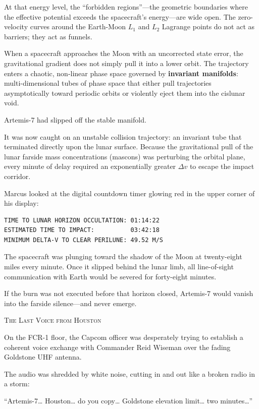 \documentclass[12pt,twoside,openright]{book}
\newcommand{\sceneheader}[1]{%
  \par\vspace{1.8em}%
  {\noindent\centering\scshape\large #1\par}%
  \vspace{1.0em}%
  \noindent%
}
\newcommand{\dinkus}{%
  \par\vspace{1.2em}%
  {\noindent\centering{\large $\ast\quad\ast\quad\ast$}\par}%
  \vspace{1.2em}%
  \noindent%
}
\begin{document}
At that energy level, the ``forbidden regions''---the geometric
boundaries where the effective potential exceeds the spacecraft's
energy---are wide open. The zero-velocity curves around the Earth-Moon
\(L_1\) and \(L_2\) Lagrange points do not act as barriers; they act as
funnels.

When a spacecraft approaches the Moon with an uncorrected state error,
the gravitational gradient does not simply pull it into a lower orbit.
The trajectory enters a chaotic, non-linear phase space governed by
\textbf{invariant manifolds}: multi-dimensional tubes of phase space
that either pull trajectories asymptotically toward periodic orbits or
violently eject them into the cislunar void.

Artemis-7 had slipped off the stable manifold.

It was now caught on an unstable collision trajectory: an invariant tube
that terminated directly upon the lunar surface. Because the
gravitational pull of the lunar farside mass concentrations (mascons)
was perturbing the orbital plane, every minute of delay required an
exponentially greater \(\Delta v\) to escape the impact corridor.

Marcus looked at the digital countdown timer glowing red in the upper
corner of his display:

\begin{lstlisting}
TIME TO LUNAR HORIZON OCCULTATION: 01:14:22
ESTIMATED TIME TO IMPACT:          03:42:18
MINIMUM DELTA-V TO CLEAR PERILUNE: 49.52 M/S
\end{lstlisting}

The spacecraft was plunging toward the shadow of the Moon at
twenty-eight miles every minute. Once it slipped behind the lunar limb,
all line-of-sight communication with Earth would be severed for
forty-eight minutes.

If the burn was not executed before that horizon closed, Artemis-7 would
vanish into the farside silence---and never emerge.

\dinkus

\sceneheader{The Last Voice from
Houston}

On the FCR-1 floor, the Capcom officer was desperately trying to
establish a coherent voice exchange with Commander Reid Wiseman over the
fading Goldstone UHF antenna.

The audio was shredded by white noise, cutting in and out like a broken
radio in a storm:

``Artemis-7\ldots{} Houston\ldots{} do you copy\ldots{} Goldstone
elevation limit\ldots{} two minutes\ldots{}''
\end{document}
